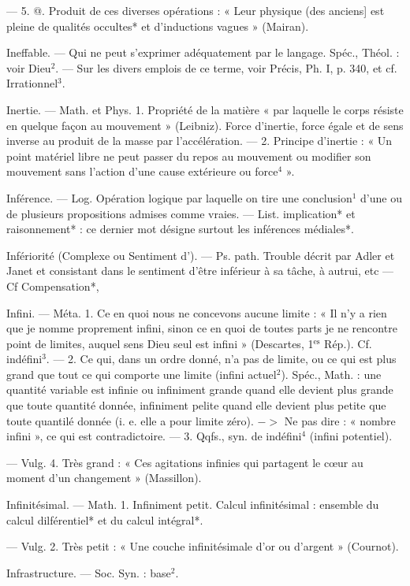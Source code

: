 — 5. @. Produit de ces diverses
opérations : « Leur physique (des
anciens] est pleine de qualités occultes* et d'inductions vagues »
(Mairan).

Ineffable. — Qui ne peut s'exprimer
adéquatement par le langage. Spéc.,
Théol. : voir Dieu$^2$. — Sur les divers
emplois de ce terme, voir Précis,
Ph. I, p. 340, et cf. Irrationnel$^3$.

Inertie. — Math. et Phys. 1. Propriété
de la matière « par laquelle le corps
résiste en quelque façon au mouvement » (Leibniz). Force d'inertie,
force égale et de sens inverse au
produit de la masse par l'accélération. — 2. Principe d'inertie : « Un
point matériel libre ne peut passer
du repos au mouvement ou modifier
son mouvement sans l’action d’une
cause extérieure ou force$^4$ ».

Inférence. — Log. Opération logique
par laquelle on tire une conclusion$^1$
d’une ou de plusieurs propositions
admises comme vraies. — List.
implication* et raisonnement* : ce
dernier mot désigne surtout les inférences médiales*.

Infériorité (Complexe ou Sentiment d').
— Ps. path. Trouble décrit par
Adler et Janet et consistant dans le
sentiment d'être inférieur à sa
tâche, à autrui, etc — Cf Compensation*,

Infini. — Méta. 1. Ce en quoi nous ne
concevons aucune limite : « Il n’y a
rien que je nomme proprement
infini, sinon ce en quoi de toutes
parts je ne rencontre point de limites, auquel sens Dieu seul est
infini » (Descartes, 1$^\text{es}$ Rép.). Cf.
indéfini$^3$. — 2. Ce qui, dans un
ordre donné, n'a pas de limite, ou
ce qui est plus grand que tout ce
qui comporte une limite (infini
actuel$^2$). Spéc., Math. : une quantité
variable est infinie ou infiniment
grande quand elle devient plus
grande que toute quantité donnée,
infiniment pelite quand elle devient
plus petite que toute quantilé
donnée (i. e. elle a pour limite zéro).
$->$ Ne pas dire : « nombre infini »,
ce qui est contradictoire. — 3. Qqfs.,
syn. de indéfini$^4$ (infini potentiel).

— Vulg. 4. Très grand : « Ces
agitations infinies qui partagent le
cœur au moment d’un changement » (Massillon).

Infinitésimal. — Math. 1. Infiniment
petit. Calcul infinitésimal : ensemble
du calcul dilférentiel* et du calcul
intégral*.

— Vulg. 2. Très petit : « Une
couche infinitésimale d’or ou d’argent » (Cournot).

Infrastructure. — Soc. Syn. : base$^2$.

